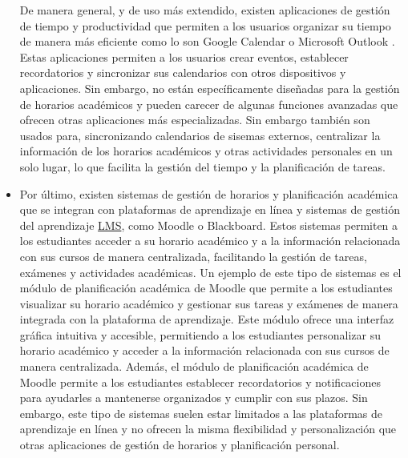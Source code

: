 \begin{itemize}
      De manera general, y de uso más extendido, existen aplicaciones de gestión de tiempo y productividad que permiten a los usuarios organizar su tiempo de manera más eficiente como lo son Google Calendar \cite{webGoogleCalendar} o Microsoft Outlook \cite{webOutlook}.
      Estas aplicaciones permiten a los usuarios crear eventos, establecer recordatorios y sincronizar sus calendarios con otros dispositivos y aplicaciones. Sin embargo, no están específicamente diseñadas para la gestión de horarios académicos y pueden carecer de algunas funciones avanzadas que ofrecen otras aplicaciones más especializadas.
      Sin embargo también son usados para, sincronizando calendarios de sisemas externos, centralizar la información de los horarios académicos y otras actividades personales en un solo lugar, lo que facilita la gestión del tiempo y la planificación de tareas.

      \item Por último, existen sistemas de gestión de horarios y planificación académica que se integran con plataformas de aprendizaje en línea y sistemas de gestión del aprendizaje \hyperlink{lms}{LMS}, como Moodle \cite{webMoodle} o Blackboard.
      Estos sistemas permiten a los estudiantes acceder a su horario académico y a la información relacionada con sus cursos de manera centralizada, facilitando la gestión de tareas, exámenes y actividades académicas.
      Un ejemplo de este tipo de sistemas es el módulo de planificación académica de Moodle que permite a los estudiantes visualizar su horario académico y gestionar sus tareas y exámenes de manera integrada con la plataforma de aprendizaje.
      \newline\newline
      Este módulo ofrece una interfaz gráfica intuitiva y accesible, permitiendo a los estudiantes personalizar su horario académico y acceder a la información relacionada con sus cursos de manera centralizada. Además, el módulo de planificación académica de Moodle permite a los estudiantes establecer recordatorios y notificaciones para ayudarles a mantenerse organizados y cumplir con sus plazos.
      \newline\newline
      Sin embargo, este tipo de sistemas suelen estar limitados a las plataformas de aprendizaje en línea y no ofrecen la misma flexibilidad y personalización que otras aplicaciones de gestión de horarios y planificación personal.

\end{itemize}

